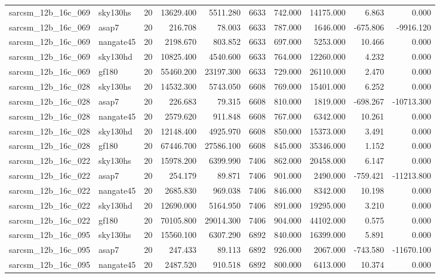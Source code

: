 \begin{longtable}{llrrrrrrrr}
sarcsm\_12b\_16c\_069 & sky130hs & 20 & 13629.400 & 5511.280 & 6633 & 742.000 & 14175.000 & 6.863 & 0.000 \\
sarcsm\_12b\_16c\_069 & asap7 & 20 & 216.708 & 78.003 & 6633 & 787.000 & 1646.000 & -675.806 & -9916.120 \\
sarcsm\_12b\_16c\_069 & nangate45 & 20 & 2198.670 & 803.852 & 6633 & 697.000 & 5253.000 & 10.466 & 0.000 \\
sarcsm\_12b\_16c\_069 & sky130hd & 20 & 10825.400 & 4540.600 & 6633 & 764.000 & 12260.000 & 4.232 & 0.000 \\
sarcsm\_12b\_16c\_069 & gf180 & 20 & 55460.200 & 23197.300 & 6633 & 729.000 & 26110.000 & 2.470 & 0.000 \\
sarcsm\_12b\_16c\_028 & sky130hs & 20 & 14532.300 & 5743.050 & 6608 & 769.000 & 15401.000 & 6.252 & 0.000 \\
sarcsm\_12b\_16c\_028 & asap7 & 20 & 226.683 & 79.315 & 6608 & 810.000 & 1819.000 & -698.267 & -10713.300 \\
sarcsm\_12b\_16c\_028 & nangate45 & 20 & 2579.620 & 911.848 & 6608 & 767.000 & 6342.000 & 10.261 & 0.000 \\
sarcsm\_12b\_16c\_028 & sky130hd & 20 & 12148.400 & 4925.970 & 6608 & 850.000 & 15373.000 & 3.491 & 0.000 \\
sarcsm\_12b\_16c\_028 & gf180 & 20 & 67446.700 & 27586.100 & 6608 & 845.000 & 35346.000 & 1.152 & 0.000 \\
sarcsm\_12b\_16c\_022 & sky130hs & 20 & 15978.200 & 6399.990 & 7406 & 862.000 & 20458.000 & 6.147 & 0.000 \\
sarcsm\_12b\_16c\_022 & asap7 & 20 & 254.179 & 89.871 & 7406 & 901.000 & 2490.000 & -759.421 & -11213.800 \\
sarcsm\_12b\_16c\_022 & nangate45 & 20 & 2685.830 & 969.038 & 7406 & 846.000 & 8342.000 & 10.198 & 0.000 \\
sarcsm\_12b\_16c\_022 & sky130hd & 20 & 12690.000 & 5164.950 & 7406 & 891.000 & 19295.000 & 3.210 & 0.000 \\
sarcsm\_12b\_16c\_022 & gf180 & 20 & 70105.800 & 29014.300 & 7406 & 904.000 & 44102.000 & 0.575 & 0.000 \\
sarcsm\_12b\_16c\_095 & sky130hs & 20 & 15560.100 & 6307.290 & 6892 & 840.000 & 16399.000 & 5.891 & 0.000 \\
sarcsm\_12b\_16c\_095 & asap7 & 20 & 247.433 & 89.113 & 6892 & 926.000 & 2067.000 & -743.580 & -11670.100 \\
sarcsm\_12b\_16c\_095 & nangate45 & 20 & 2487.520 & 910.518 & 6892 & 800.000 & 6413.000 & 10.374 & 0.000 \\

\end{longtable}
